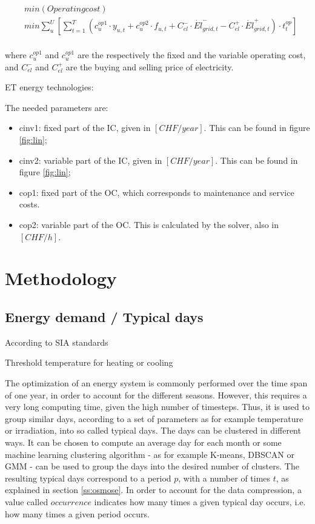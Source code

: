 \documentclass{article}
\begin{document}
\begin{align}
& min \left( Operating cost \right) \\
& min \sum_{u}^{U} \left[ \sum_{t = 1}^{T} \left( c_{u}^{op1} \cdot y_{u,t} + c_{u}^{op2} \cdot f_{u,t} + C_{el}^{-} \cdot \dot{El}_{grid,t}^{-} - C_{el}^{+} \cdot \dot{El}_{grid,t}^{+} \right) \cdot t_{t}^{op} \right] \\
\end{align}

where $c_{u}^{op1}$ and $c_{u}^{op1}$ are the respectively the fixed and the variable operating cost, and $C_{el}^{-}$ and $C_{el}^{+}$ are the buying and selling price of electricity.

ET energy technologies:

The needed parameters are:
\begin{itemize}
	\item cinv1: fixed part of the IC, given in $[CHF/year]$. This can be found in figure \ref{fig:lin};
	\item cinv2: variable part of the IC, given in $[CHF/year]$. This can be found in figure \ref{fig:lin};
	\item cop1: fixed part of the OC, which corresponds to maintenance and service costs. 
	\item cop2: variable part of the OC. This is calculated by the solver, also in $[CHF/h]$.
\end{itemize}

\section{Methodology}

\subsection{Energy demand / Typical days}
According to SIA standards

Threshold temperature for heating or cooling


The optimization of an energy system is commonly performed over the time span of one year, in order to account for the different seasons. However, this requires a very long computing time, given the high number of timesteps. Thus, it is used to group similar days, according to a set of parameters as for example temperature or irradiation, into so called typical days. The days can be clustered in different ways. It can be chosen to compute an average day for each month or some machine learning clustering algorithm - as for example K-means, DBSCAN or GMM - can be used to group the days into the desired number of clusters.
The resulting typical days correspond to a period $p$, with a number of times $t$, as explained in section \ref{ss:osmose}. In order to account for the data compression, a value called $occurrence$ indicates how many times a given typical day occurs, i.e. how many times a given period occurs.\\
\end{document}
